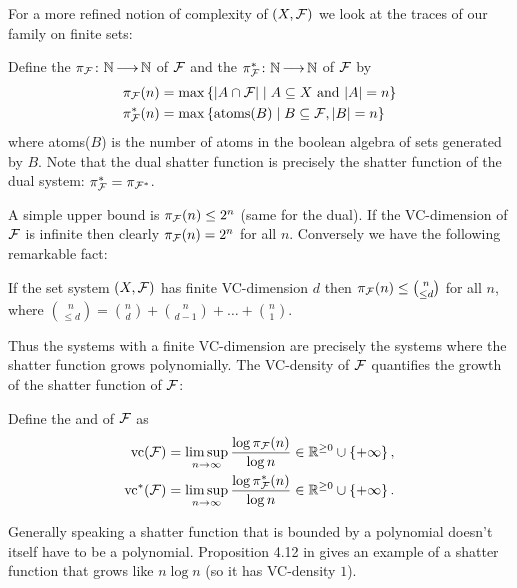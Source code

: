 For a more refined notion of complexity of $(X, \mathcal F)$ we look at the traces of our family on finite sets:
\begin{Definition}
  Define the  $\pi_\mathcal F \colon \mathbb{N} \operatorname{\longrightarrow} \mathbb{N}$ of $\mathcal F$ and the  $\pi^*_\mathcal F \colon \mathbb{N} \operatorname{\longrightarrow} \mathbb{N}$ of $\mathcal F$ by 
  \begin{align*}
    \pi_\mathcal F(n) &= \max \left\{|A \cap \mathcal F| \mid A \subseteq X \text{ and } |A| = n\right\} \\
    \pi^*_\mathcal F(n) &= \max \left\{\text{atoms($B$)} \mid B \subseteq \mathcal F, |B| = n\right\}
  \end{align*}
  where atoms($B$) is the number of atoms in the boolean algebra of sets generated by $B$.
  Note that the dual shatter function is precisely the shatter function of the dual system: $\pi^*_\mathcal F = \pi_{\mathcal F^*}$.
\end{Definition}  

A simple upper bound is $\pi_\mathcal F(n) \leq 2^n$ (same for the dual).
If the VC-dimension of $\mathcal F$ is infinite then clearly $\pi_\mathcal F(n) = 2^n$ for all $n$. Conversely we have the following remarkable fact:
\begin{Theorem} 
  If the set system $(X, \mathcal F)$ has finite VC-dimension $d$ then $\pi_\mathcal F(n) \leq {n \choose \leq d}$ for all $n$, where
  ${n \choose \leq d} = {n \choose d} + {n \choose d - 1} + \ldots + {n \choose 1}$.    
\end{Theorem}

Thus the systems with a finite VC-dimension are precisely the systems where the shatter function grows polynomially.
The VC-density of $\mathcal F$ quantifies the growth of the shatter function of $\mathcal F$: 
\begin{Definition}
  Define the  and  of $\mathcal F$ as
  \begin{align*}
    \operatorname{vc}(\mathcal F) &= \limsup_{n \to \infty}\frac{\log \pi_\mathcal F(n)}{\log n} \in \mathbb{R}^{\geq 0} \cup \left\{+\infty\right\},\\
    \operatorname{vc}^*(\mathcal F) &= \limsup_{n \to \infty}\frac{\log \pi^*_\mathcal F(n)}{\log n}\in \mathbb{R}^{\geq 0} \cup \left\{+\infty\right\}.
  \end{align*}
\end{Definition}

Generally speaking a shatter function that is bounded by a polynomial doesn't itself have to be a polynomial.
Proposition 4.12 in \cite{density} gives an example of a shatter function that grows like $n \log n$ (so it has VC-density $1$).


